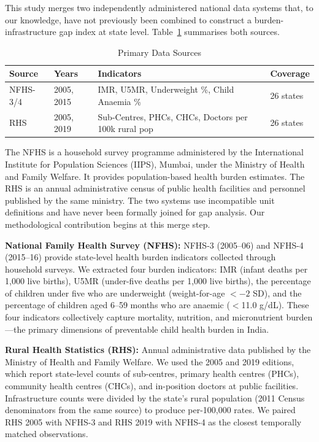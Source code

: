 \documentclass[conference]{IEEEtran}
\begin{document}
This study merges two independently administered national data
systems that, to our knowledge, have not previously been combined
to construct a burden-infrastructure gap index at state level.
Table~\ref{tab:datasources} summarises both sources.

\begin{table}[htbp]
\caption{Primary Data Sources}
\label{tab:datasources}
\centering
\begin{tabular}{p{1.5cm}p{0.8cm}p{2.2cm}p{1.4cm}}
\toprule
Source & Years & Indicators & Coverage \\
\midrule
NFHS-3/4 & 2005, 2015 & IMR, U5MR, Underweight \%, Child Anaemia \% & 26 states \\[4pt]
RHS & 2005, 2019 & Sub-Centres, PHCs, CHCs, Doctors per 100k rural pop & 26 states \\
\bottomrule
\end{tabular}
\end{table}

The NFHS is a household survey programme administered by the
International Institute for Population Sciences (IIPS), Mumbai,
under the Ministry of Health and Family Welfare. It provides
population-based health burden estimates. The RHS is an annual
administrative census of public health facilities and personnel
published by the same ministry. The two systems use incompatible
unit definitions and have never been formally joined for gap analysis.
Our methodological contribution begins at this merge step.

\textbf{National Family Health Survey (NFHS):} NFHS-3 (2005--06)
and NFHS-4 (2015--16) provide state-level health burden indicators
collected through household surveys. We extracted four burden
indicators: IMR (infant deaths per 1,000 live births), U5MR
(under-five deaths per 1,000 live births), the percentage of
children under five who are underweight (weight-for-age $<-2$ SD),
and the percentage of children aged 6--59 months who are anaemic
($<$11.0 g/dL). These four indicators collectively capture mortality,
nutrition, and micronutrient burden---the primary dimensions of
preventable child health burden in India.

\textbf{Rural Health Statistics (RHS):} Annual administrative data
published by the Ministry of Health and Family Welfare. We used the
2005 and 2019 editions, which report state-level counts of
sub-centres, primary health centres (PHCs), community health centres
(CHCs), and in-position doctors at public facilities. Infrastructure
counts were divided by the state's rural population (2011 Census
denominators from the same source) to produce per-100,000 rates.
We paired RHS 2005 with NFHS-3 and RHS 2019 with NFHS-4 as the
closest temporally matched observations.
\end{document}
